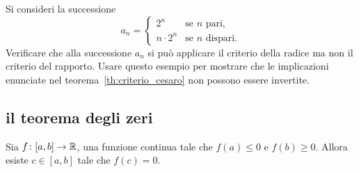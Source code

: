  \begin{exercise}
 Si consideri la successione
 \[
 a_n =
 \begin{cases}
    2^n &\text{se $n$ pari},\\
    n\cdot 2^n &\text{se $n$ dispari}.
 \end{cases}
 \]
 Verificare che alla successione $a_n$
  si può applicare il criterio della radice ma
  non il criterio del rapporto.
  Usare questo esempio per mostrare che le implicazioni
  enunciate nel teorema~\ref{th:criterio_cesaro} non
  possono essere invertite.
\end{exercise}  

\subsection{il teorema degli zeri}

\begin{theorem}
\mymark{***}%
%
%
\label{th:zeri}%
Sia $f\colon[a,b] \to {\mathbb R}$, una funzione
continua tale che $f(a)\le 0$ e $f(b)\ge 0$.
Allora esiste
 $c\in [a,b]$ tale che $f(c)=0$.
\end{theorem}


